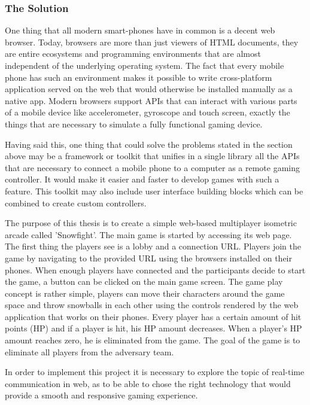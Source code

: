 \subsubsection{The Solution}

One thing that all modern smart-phones have in common is a decent web browser.
Today, browsers are more than just viewers of HTML documents, they are entire
ecosystems and programming environments that are almost independent of the
underlying operating system. The fact that every mobile phone has such an
environment makes it possible to write cross-platform application served on
the web that would otherwise be installed manually as a native app. Modern
browsers support APIs that can interact with various parts of a mobile device
like accelerometer, gyroscope and touch screen, exactly the things that are
necessary to simulate a fully functional gaming device.

Having said this, one thing that could solve the problems stated in the
section above may be a framework or toolkit that unifies in a single library
all the APIs that are necessary to connect a mobile phone to a computer as a
remote gaming controller. It would make it easier and faster to develop games
with such a feature. This toolkit may also include user interface building
blocks which can be combined to create custom controllers.

The purpose of this thesis is to create a simple web-based multiplayer
isometric arcade called 'Snowfight'. The main game is started by accessing its
web page. The first thing the players see is a lobby and a connection URL.
Players join the game by navigating to the provided URL using the browsers
installed on their phones. When enough players have connected and the
participants decide to start the game, a button can be clicked on the main
game screen. The game play concept is rather simple, players can move their
characters around the game space and throw snowballs in each other using the
controls rendered by the web application that works on their phones. Every
player has a certain amount of hit points (HP) and if a player is hit, his HP
amount decreases. When a player's HP amount reaches zero, he is eliminated
from the game. The goal of the game is to eliminate all players from the
adversary team.

In order to implement this project it is necessary to explore the topic of
real-time communication in web, as to be able to chose the right technology
that would provide a smooth and responsive gaming experience.




